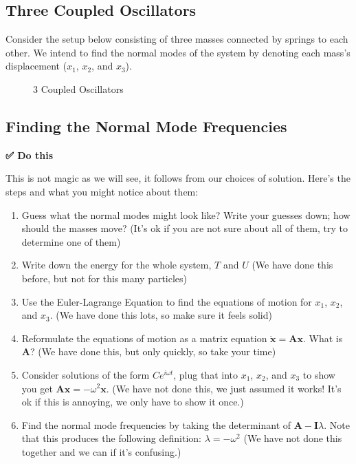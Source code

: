 \begin{Shaded}
\begin{Highlighting}[]
\end{Highlighting}
\end{Shaded}

\subsection{Three Coupled Oscillators}\label{three-coupled-oscillators}

Consider the setup below consisting of three masses connected by springs
to each other. We intend to find the normal modes of the system by
denoting each mass's displacement (\(x_1\), \(x_2\), and \(x_3\)).

\begin{figure}
\centering
{}
\caption{3 Coupled Oscillators}
\end{figure}

\subsection{Finding the Normal Mode
Frequencies}\label{finding-the-normal-mode-frequencies}

\textbf{✅ Do this}

This is not magic as we will see, it follows from our choices of
solution. Here's the steps and what you might notice about them:

\begin{enumerate}
\def\labelenumi{\arabic{enumi}.}
\tightlist
\item
  Guess what the normal modes might look like? Write your guesses down;
  how should the masses move? (It's ok if you are not sure about all of
  them, try to determine one of them)
\item
  Write down the energy for the whole system, \(T\) and \(U\) (We have
  done this before, but not for this many particles)
\item
  Use the Euler-Lagrange Equation to find the equations of motion for
  \(x_1\), \(x_2\), and \(x_3\). (We have done this lots, so make sure
  it feels solid)
\item
  Reformulate the equations of motion as a matrix equation
  \(\ddot{\mathbf{x}} = \mathbf{A} \mathbf{x}\). What is \(\mathbf{A}\)?
  (We have done this, but only quickly, so take your time)
\item
  Consider solutions of the form \(Ce^{i{\omega}t}\), plug that into
  \(x_1\), \(x_2\), and \(x_3\) to show you get
  \(\mathbf{A}\mathbf{x} = -\omega^2 \mathbf{x}\). (We have not done
  this, we just assumed it works! It's ok if this is annoying, we only
  have to show it once.)
\item
  Find the normal mode frequencies by taking the determinant of
  \(\mathbf{A} - \mathbf{I}\lambda\). Note that this produces the
  following definition: \(\lambda = -\omega^2\) (We have not done this
  together and we can if it's confusing.)
\end{enumerate}

